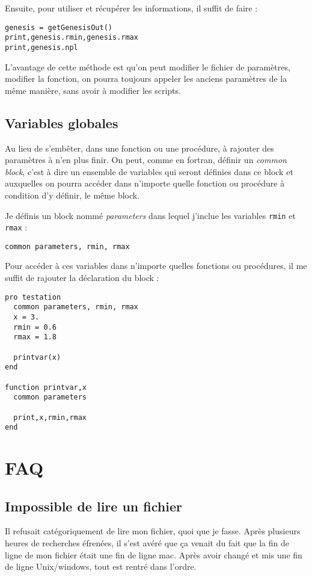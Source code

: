 \documentclass[a4paper,twoside]{article}
\begin{document}
Ensuite, pour utiliser et récupérer les informations, il suffit de faire :
\begin{lstlisting}[language=IDL]
genesis = getGenesisOut()
print,genesis.rmin,genesis.rmax
print,genesis.npl
\end{lstlisting}

L'avantage de cette méthode est qu'on peut modifier le fichier de paramètres, modifier la fonction, on pourra toujours appeler les anciens paramètres de la même manière, sans avoir à modifier les scripts.

\subsection{Variables globales}
Au lieu de s'embêter, dans une fonction ou une procédure, à rajouter des paramètres à n'en plus finir. On peut, comme en fortran, définir un \emph{common block}, c'est à dire un ensemble de variables qui seront définies dans ce block et auxquelles on pourra accéder dans n'importe quelle fonction ou procédure à condition d'y définir, le même block.

\begin{exemple}
Je définis un block nommé \emph{parameters} dans lequel j'inclue les variables \texttt{rmin} et \texttt{rmax} :
\begin{lstlisting}[language=IDL]
common parameters, rmin, rmax
\end{lstlisting}

Pour accéder à ces variables dans n'importe quelles fonctions ou procédures, il me suffit de rajouter la déclaration du block :
\begin{lstlisting}[language=IDL]
pro testation
  common parameters, rmin, rmax
  x = 3.
  rmin = 0.6
  rmax = 1.8

  printvar(x)
end

function printvar,x
  common parameters

  print,x,rmin,rmax
end
\end{lstlisting}
\end{exemple}


\section{FAQ}
\subsection{Impossible de lire un fichier}
Il refusait catégoriquement de lire mon fichier, quoi que je fasse. Après plusieurs heures de recherches éfrenées, il s'est avéré que ça venait du fait que la fin de ligne de mon fichier était une fin de ligne mac. Après avoir changé et mis une fin de ligne Unix/windows, tout est rentré dans l'ordre.
\end{document}
